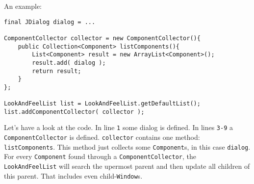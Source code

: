 \documentclass[a4paper,10pt]{article}
\newcommand{\src}[1]{\lstinline[basicstyle=\ttfamily]|#1|}
\begin{document}
An example:
\begin{lstlisting}
final JDialog dialog = ...

ComponentCollector collector = new ComponentCollector(){
	public Collection<Component> listComponents(){
		List<Component> result = new ArrayList<Component>();
		result.add( dialog );
		return result;
	}
};

LookAndFeelList list = LookAndFeelList.getDefaultList();
list.addComponentCollector( collector );
\end{lstlisting}
Let's have a look at the code. In line \src{1} some dialog is defined. In lines \src{3-9} a \src{ComponentCollector} is defined. \src{collector} contains one method: \src{listComponents}. This method just collects some \src{Component}s, in this case \src{dialog}. For every \src{Component} found through a \src{ComponentCollector}, the \src{LookAndFeelList} will search the upermost parent and then update all children of this parent. That includes even child-\src{Window}s.
\end{document}
